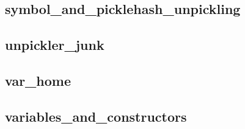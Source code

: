 \subsection{symbol\_and\_picklehash\_unpickling}		
\subsection{unpickler\_junk}					
\subsection{var\_home}						
\subsection{variables\_and\_constructors}			

